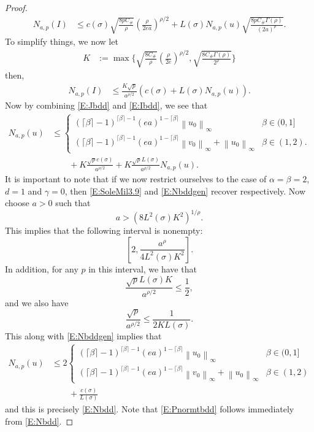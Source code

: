 \documentclass[a4paper,11pt]{article}
\numberwithin{equation}{section}
\theoremstyle{plain}
\theoremstyle{definition}
\newcommand{\Norm}[1]{\left\|  #1   \right\|}
\numberwithin{NQ}{section}
\numberwithin{LQ}{section}
\numberwithin{ZQ}{section}
\begin{document}
\begin{proof}
		\begin{align}
		N_{a,p}(I) &\le  c(\sigma)\sqrt{\frac{8pC_{\#}  }{\rho}} \left(\frac{\rho}{2ea}\right)^{\rho/2} +  L(\sigma)N_{a,p}(u) \sqrt{\frac{8pC_{\#} \Gamma\left( \rho \right)}{(2a)^\rho} }. \label{E:SoleMil3.9}
		\end{align}
		To simplify things, we now let 
		\begin{align*}
		K&:= \max\Bigg\{\sqrt{\frac{8C_{\#}  }{\rho}} \left(\frac{\rho}{2e}\right)^{\rho/2}, \sqrt{\frac{8C_{\#} \Gamma\left( \rho \right) }{2^{\rho}}}  \Bigg\}
		\end{align*}
		then,
		\begin{align}
		\label{E:Ibdd}
		N_{a,p}(I) &\le\frac{K \sqrt{p}}{a^{\rho/2}}\left( c(\sigma) + L(\sigma)N_{a,p}(u) \right).
		\end{align}
		Now by combining \eqref{E:Jbdd} and \eqref{E:Ibdd}, we see that 
		\begin{align}
		N_{a,p}(u) & \le \begin{cases} 
		(\lceil \beta \rceil - 1)^{\lceil \beta \rceil -1}(ea)^{1-\lceil \beta \rceil} \Norm{u_0}_\infty  & \beta \in (0,1]
		\\ (\lceil \beta \rceil - 1)^{\lceil \beta \rceil -1}(ea)^{1-\lceil \beta \rceil} \Norm{v_0}_\infty + \Norm{u_0}_\infty & \beta \in (1,2). 
		\end{cases} 
		\\& \quad \quad  + K\frac{\sqrt{p}c(\sigma)}{a^{\rho/2} }  + K  \frac{\sqrt{p}L(\sigma)}{a^{\rho/2}} N_{a,p}(u). \label{E:Nbddgen}
		\end{align}
		It is important to note that if we now restrict ourselves to the case of $\alpha = \beta = 2$, $d=1$ and $\gamma =0$, then \eqref{E:SoleMil3.9} and \eqref{E:Nbddgen} recover \cite[(3.9) and (3.10)]{SoleMillet2021} respectively. Now choose $a>0$ such that 
		\[
		a > \left( 8 L^2(\sigma)K^2\right)^{1/\rho}.
		\]
		This implies that the following interval is nonempty:
		\[
		\left[ 2, \frac{a^{\rho}}{4L^2(\sigma)K^2} \right].
		\]
		In addition, for any $p$ in this interval, we have that 
		\[
		\frac{\sqrt{p}L(\sigma)K}{a^{\rho/2}} \le \frac{1}{2},
		\]
		and we also have 
		\[
		\frac{\sqrt{p}}{a^{\rho/2}}  \le \frac{1}{2KL(\sigma)}.
		\]
		This along with \eqref{E:Nbddgen} implies that 
		\begin{align*}
		N_{a,p}(u) & \le 2 \begin{cases} 
		(\lceil \beta \rceil - 1)^{\lceil \beta \rceil -1}(ea)^{1-\lceil \beta \rceil} \Norm{u_0}_\infty  & \beta \in (0,1]
		\\ (\lceil \beta \rceil - 1)^{\lceil \beta \rceil -1}(ea)^{1-\lceil \beta \rceil} \Norm{v_0}_\infty + \Norm{u_0}_\infty & \beta \in (1,2)
		\end{cases} 
		\\& \quad \quad + \frac{c(\sigma)}{L(\sigma)}
		\end{align*}
		and this is precisely \eqref{E:Nbdd}. Note that \eqref{E:Pnormtbdd} follows immediately from \eqref{E:Nbdd}.  
	\end{proof}
	
\end{document}
